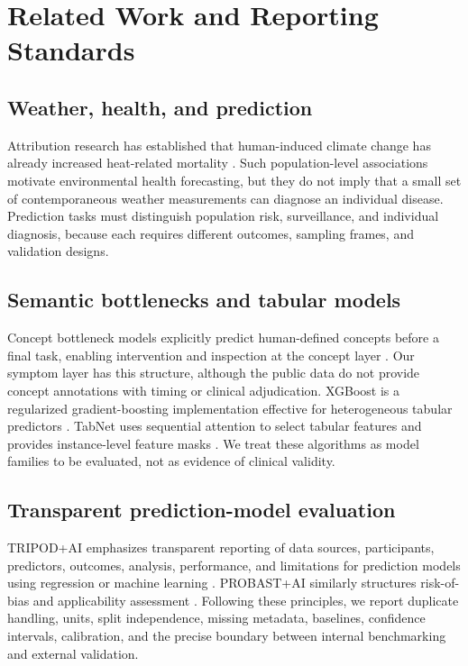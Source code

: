 \documentclass[conference]{IEEEtran}
\begin{document}
\section{Related Work and Reporting Standards}

\subsection{Weather, health, and prediction}

Attribution research has established that human-induced climate change has
already increased heat-related mortality \cite{vicedo2021}. Such population-level
associations motivate environmental health forecasting, but they do not imply
that a small set of contemporaneous weather measurements can diagnose an
individual disease. Prediction tasks must distinguish population risk,
surveillance, and individual diagnosis, because each requires different
outcomes, sampling frames, and validation designs.

\subsection{Semantic bottlenecks and tabular models}

Concept bottleneck models explicitly predict human-defined concepts before a
final task, enabling intervention and inspection at the concept layer
\cite{koh2020}. Our symptom layer has this structure, although the public data
do not provide concept annotations with timing or clinical adjudication.
XGBoost is a regularized gradient-boosting implementation effective for
heterogeneous tabular predictors \cite{chen2016}. TabNet uses sequential
attention to select tabular features and provides instance-level feature masks
\cite{arik2021}. We treat these algorithms as model families to be evaluated,
not as evidence of clinical validity.

\subsection{Transparent prediction-model evaluation}

TRIPOD+AI emphasizes transparent reporting of data sources, participants,
predictors, outcomes, analysis, performance, and limitations for prediction
models using regression or machine learning \cite{collins2024}. PROBAST+AI
similarly structures risk-of-bias and applicability assessment
\cite{moons2025}. Following these principles, we report duplicate handling,
units, split independence, missing metadata, baselines, confidence intervals,
calibration, and the precise boundary between internal benchmarking and
external validation.
\end{document}
